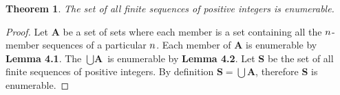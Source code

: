 \documentclass[a4paper,11pt]{article}
\newtheorem{thm}{Theorem}[section]
\begin{document}
	\bigskip

	\begin{thm}The set of all finite sequences of positive integers is enumerable.\end{thm}

	\begin{proof}
	Let \textbf{A} be a set of sets where each member is a set containing all the $\mathnormal{n}$-member 
	sequences of a particular $\mathnormal{n}$. Each member of \textbf{A} is enumerable by \textbf{Lemma 
	4.1}. The $\bigcup \textbf{A}$ is enumerable by \textbf{Lemma 4.2}. Let \textbf{S} be the set of all finite
	sequences of positive integers. By definition $\textbf{S} = \bigcup \textbf{A}$, therefore \textbf{S} is 
	enumerable.
	\end{proof}
\end{document}
